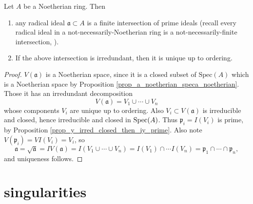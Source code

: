 \documentclass[12pt]{article}
\begin{document}
\begin{corollary}
	Let $A$ be a Noetherian ring. Then 
	\begin{enumerate}
		\item any radical ideal $\mathfrak{a}\subset A$ is a finite intersection of prime ideals (recall every radical ideal in a not-necessarily-Noetherian ring is a not-necessarily-finite intersection, ).
		\item If the above intersection is irredundant, then it is unique up to ordering.
	\end{enumerate}
\end{corollary}
\begin{proof}
	$V(\mathfrak{a})$ is a Noetherian space, since it is a closed subset of $\text{Spec}(A)$ which is a Noetherian space by Proposition \ref{prop_a_noetherian_speca_noetherian}. Those it has an irredundant decomposition 
	\begin{equation*}
		V(\mathfrak{a}) = V_1 \cup \cdots \cup V_n
	\end{equation*}
	whose components $V_i$ are unique up to ordering. Also $V_i\subset V(\mathfrak{a})$ is irreducible and closed, hence irreducible and closed in $\text{Spec}(A)$. Thus $\mathfrak{p}_i = I(V_i)$ is prime, by Proposition \ref{prop_y_irred_closed_then_iy_prime}. Also note $V(\mathfrak{p}_i) = VI(V_i) = V_i$, so 
	\begin{equation*}
		\mathfrak{a} = \sqrt{\mathfrak{a}} = IV(\mathfrak{a}) =I(V_1\cup\cdots\cup V_n) = I(V_1)\cap\cdots I(V_n) = \mathfrak{p}_1\cap\cdots\cap\mathfrak{p}_n,
	\end{equation*}
	and uniqueness follows.
\end{proof}



\section{singularities} %
\end{document}
